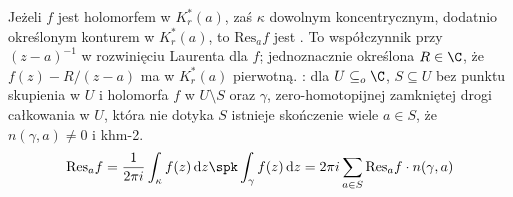 

Jeżeli  $f$ jest holomorfem w $K_r^*(a)$, zaś $\kappa$ dowolnym koncentrycznym, dodatnio określonym konturem w $K_r^*(a)$, to $\textrm{Res}_a f$ jest .
To współczynnik przy $(z-a)^{-1}$ w rozwinięciu Laurenta dla $f$; jednoznacznie określona $R \in \C$, że $f(z) - R / (z-a)$ ma w $K_r^*(a)$ pierwotną.
: dla $U \subseteq_o \C$, $S \subseteq U$ bez punktu skupienia w $U$ i holomorfa $f$ w $U \setminus S$ oraz $\gamma$, zero-homotopijnej zamkniętej drogi całkowania w $U$, która nie dotyka $S$ istnieje skończenie wiele $a \in S$, że $n(\gamma, a) \neq 0$ i khm-2.
\[
	\textrm{Res}_a f = \frac 1 {2\pi i} \int_{\kappa} f(z) \,\textrm{d}z \spk
	\int_\gamma f(z) \,\textrm{d}z = 2\pi i \sum_{a \in S} \textrm{Res}_a f \cdot n(\gamma, a)
\]